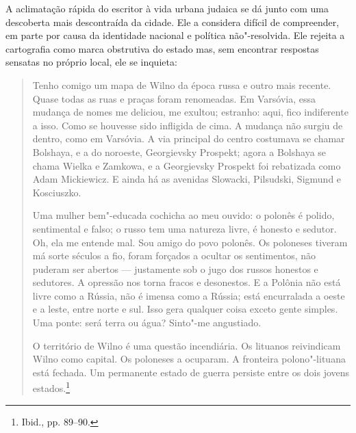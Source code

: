 A aclimatação rápida do escritor à vida urbana judaica se dá junto com
uma descoberta mais descontraída da cidade. Ele a considera difícil de
compreender, em parte por causa da identidade nacional e política
não"-resolvida. Ele rejeita a cartografia como marca obstrutiva do estado
mas, sem encontrar respostas sensatas no próprio local, ele se inquieta:

\begin{quote}
Tenho comigo um mapa de Wilno da época russa e outro mais recente. Quase
todas as ruas e praças foram renomeadas. Em Varsóvia, essa mudança de
nomes me deliciou, me exultou; estranho: aqui, fico indiferente a isso.
Como se houvesse sido infligida de cima. A mudança não surgiu de dentro,
como em Varsóvia. A via principal do centro costumava se chamar
Bolshaya, e a do noroeste, Georgievsky Prospekt; agora a Bolshaya se
chama Wielka e Zamkowa, e a Georgievsky Prospekt foi rebatizada como
Adam Mickiewicz. E ainda há as avenidas Slowacki, Pilsudski, Sigmund e
Kosciuszko.

Uma mulher bem"-educada cochicha ao meu ouvido: o polonês é polido,
sentimental e falso; o russo tem uma natureza livre, é honesto e
sedutor. Oh, ela me entende mal. Sou amigo do povo polonês. Os poloneses
tiveram má sorte séculos a fio, foram forçados a ocultar os sentimentos,
não puderam ser abertos --- justamente sob o jugo dos russos honestos e
sedutores. A opressão nos torna fracos e desonestos. E a Polônia não
está livre como a Rússia, não é imensa como a Rússia; está encurralada a
oeste e a leste, entre norte e sul. Isso gera qualquer coisa exceto
gente simples. Uma ponte: será terra ou água? Sinto"-me angustiado.

O território de Wilno é uma questão incendiária. Os lituanos reivindicam
Wilno como capital. Os poloneses a ocuparam. A fronteira polono"-lituana
está fechada. Um permanente estado de guerra persiste entre os dois
jovens estados.\footnote{Ibid., pp. 89--90.}
\end{quote}

